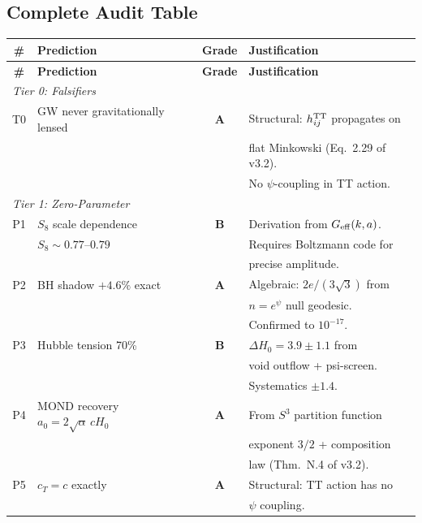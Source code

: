 \documentclass[11pt]{article}
\begin{document}
\subsection{Complete Audit Table}

\begin{longtable}{clcl}
\toprule
\textbf{\#} & \textbf{Prediction} & \textbf{Grade} & \textbf{Justification} \\
\midrule
\endfirsthead
\toprule
\textbf{\#} & \textbf{Prediction} & \textbf{Grade} & \textbf{Justification} \\
\midrule
\endhead

\multicolumn{4}{l}{\textit{Tier 0: Falsifiers}} \\
\midrule
T0 & GW never gravitationally lensed & \textbf{A} &
  Structural: $h_{ij}^{\rm TT}$ propagates on \\
  & & & flat Minkowski (Eq.~2.29 of v3.2). \\
  & & & No $\psi$-coupling in TT action. \\

\midrule
\multicolumn{4}{l}{\textit{Tier 1: Zero-Parameter}} \\
\midrule
P1 & $S_8$ scale dependence & \textbf{B} &
  Derivation from $G_{\rm eff}(k,a)$. \\
  & $S_8 \sim 0.77$--$0.79$ & &
  Requires Boltzmann code for \\
  & & & precise amplitude. \\

P2 & BH shadow $+4.6\%$ exact & \textbf{A} &
  Algebraic: $2e/(3\sqrt{3})$ from \\
  & & & $n = e^\psi$ null geodesic. \\
  & & & Confirmed to $10^{-17}$. \\

P3 & Hubble tension 70\% & \textbf{B} &
  $\Delta H_0 = 3.9 \pm 1.1$ from \\
  & & & void outflow + psi-screen. \\
  & & & Systematics $\pm 1.4$. \\

P4 & MOND recovery $a_0 = 2\sqrt{\alpha}\,cH_0$ & \textbf{A} &
  From $S^3$ partition function \\
  & & & exponent $3/2$ + composition \\
  & & & law (Thm.~N.4 of v3.2). \\

P5 & $c_T = c$ exactly & \textbf{A} &
  Structural: TT action has no \\
  & & & $\psi$ coupling. \\


\end{longtable}
\end{document}
